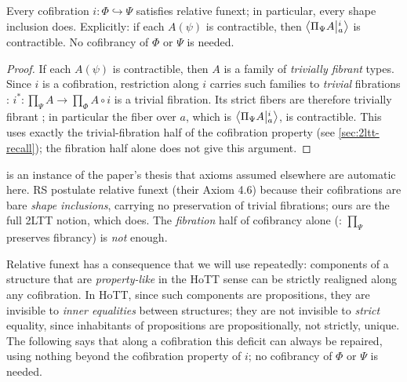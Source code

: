 \begin{lemma}\label{lem:rel-funext-holds}\label{lem:rs46}
	Every cofibration $i:\Phi\hookrightarrow\Psi$ satisfies relative
	funext; in particular, every shape inclusion does. Explicitly: if each
	$A(\psi)$ is contractible, then $\Ext{i}{\Pi_\Psi A}{a}$ is contractible. No
	cofibrancy of $\Phi$ or $\Psi$ is needed.
\end{lemma}
\begin{proof}
	If each $A(\psi)$ is contractible, then $A$ is a family of \emph{trivially
	fibrant} types. Since $i$ is a cofibration, restriction along $i$
	carries such families to \emph{trivial} fibrations \citep[Lem.~3.18]{2LTT}:
	$i^*:\prod_\Psi A\to\prod_\Phi A\circ i$ is a trivial fibration. Its strict
	fibers are therefore trivially fibrant \citep[Def.~3.7]{2LTT}; in
	particular the fiber over $a$, which is $\Ext{i}{\Pi_\Psi A}{a}$, is
	contractible. This uses exactly the trivial-fibration half of the
	cofibration property (see \cref{sec:2ltt-recall}); the fibration half
	alone does not give this argument. %
\end{proof}


\begin{longversion}
\begin{remark}\label{rem:rs-assumes-extext}
	 is an instance of the paper's thesis that axioms
	assumed elsewhere are automatic here. RS postulate relative funext (their Axiom
	4.6) because their cofibrations are bare \emph{shape inclusions}, carrying no
	preservation of trivial fibrations; ours are the full 2LTT notion, which does.
	The \emph{fibration} half of cofibrancy alone (\citealp[Cor.~3.20]{2LTT}:
	$\prod_\Psi$ preserves fibrancy) is \emph{not} enough.
\end{remark}
\end{longversion}

Relative funext has a consequence that we will use repeatedly: components of
a structure that are \emph{property-like} in the HoTT sense can be strictly
realigned along any cofibration. In HoTT, since such components are
propositions, they are invisible to \emph{inner equalities} between structures; they
are not invisible to \emph{strict} equality, since inhabitants of
propositions are propositionally, not strictly, unique. The following says
that along a cofibration this deficit can always be repaired, using nothing
beyond the cofibration property of $i$; no cofibrancy of $\Phi$ or $\Psi$
is needed.

